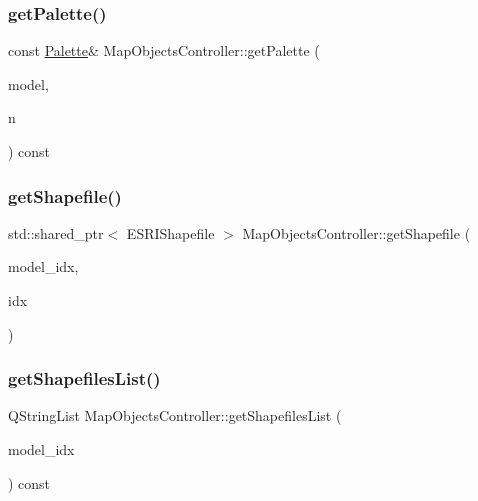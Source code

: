 \mbox{\label{class_map_objects_controller_a0472ad25b047df17413575e7e36dbf68}} 
\subsubsection{\texorpdfstring{getPalette()}{getPalette()}}
{\footnotesize\ttfamily const \mbox{\hyperlink{class_palette}{Palette}}\& Map\+Objects\+Controller\+::get\+Palette (\begin{DoxyParamCaption}\item[{int}]{model,  }\item[{\mbox{\hyperlink{palettemanager_8h_adf4610684920d9165d0d74c1ea45b269}{Palette\+Role}}}]{n }\end{DoxyParamCaption}) const\hspace{0.3cm}{\ttfamily [inline]}}

\mbox{\label{class_map_objects_controller_a8c0addc52e6f82f5541e51ac6a13a3a1}} 
\subsubsection{\texorpdfstring{getShapefile()}{getShapefile()}}
{\footnotesize\ttfamily std\+::shared\+\_\+ptr$<$ E\+S\+R\+I\+Shapefile $>$ Map\+Objects\+Controller\+::get\+Shapefile (\begin{DoxyParamCaption}\item[{int}]{model\+\_\+idx,  }\item[{int}]{idx }\end{DoxyParamCaption})}

\mbox{\label{class_map_objects_controller_a6c76b80e0704cc2f2727e9dd0d789e51}} 
\subsubsection{\texorpdfstring{getShapefilesList()}{getShapefilesList()}}
{\footnotesize\ttfamily Q\+String\+List Map\+Objects\+Controller\+::get\+Shapefiles\+List (\begin{DoxyParamCaption}\item[{int}]{model\+\_\+idx }\end{DoxyParamCaption}) const}

